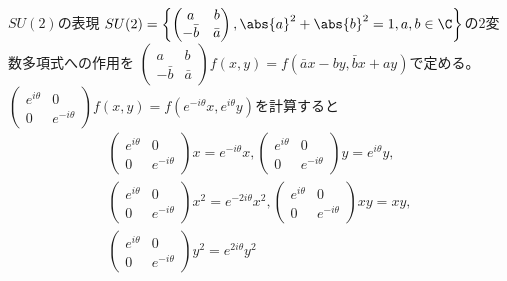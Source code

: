 \documentclass[dvipdfmx]{beamer}
\begin{document}
\begin{frame}{$SU(2)$の表現}
$SU(2)=\left\{\begin{pmatrix}a&b\\-\bar{b}&\bar{a}\end{pmatrix},\abs{a}^2+\abs{b}^2=1, a,b\in\C\right\}$の$2$変数多項式への作用を
$\begin{pmatrix}a&b\\-\bar{b}&\bar{a}\end{pmatrix}f(x,y)=f(\bar{a}x-by,\bar{b}x+ay)$で定める。
$\begin{pmatrix}e^{i\theta}&0\\0&e^{-i\theta}\end{pmatrix}f(x,y)=f(e^{-i\theta}x,e^{i\theta}y)$を計算すると
\begin{align*}
\begin{pmatrix}e^{i\theta}&0\\0&e^{-i\theta}\end{pmatrix}x=e^{-i\theta}x,
\begin{pmatrix}e^{i\theta}&0\\0&e^{-i\theta}\end{pmatrix}y=e^{i\theta}y,\\
\begin{pmatrix}e^{i\theta}&0\\0&e^{-i\theta}\end{pmatrix}x^2=e^{-2i\theta}x^2,
\begin{pmatrix}e^{i\theta}&0\\0&e^{-i\theta}\end{pmatrix}xy=xy,\\
\begin{pmatrix}e^{i\theta}&0\\0&e^{-i\theta}\end{pmatrix}y^2=e^{2i\theta}y^2
\end{align*}
\end{frame}
\end{document}
